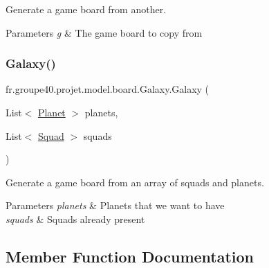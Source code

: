 Generate a game board from another. 


\begin{DoxyParams}{Parameters}
{\em g} & The game board to copy from \\
\hline
\end{DoxyParams}
\mbox{\label{classfr_1_1groupe40_1_1projet_1_1model_1_1board_1_1_galaxy_ab214654e58ccf7bc40216d177cde0479}} 
\subsubsection{\texorpdfstring{Galaxy()}{Galaxy()}\hspace{0.1cm}{\footnotesize\ttfamily [2/2]}}
{\footnotesize\ttfamily fr.\+groupe40.\+projet.\+model.\+board.\+Galaxy.\+Galaxy (\begin{DoxyParamCaption}\item[{List$<$ \mbox{\hyperlink{classfr_1_1groupe40_1_1projet_1_1model_1_1planets_1_1_planet}{Planet}} $>$}]{planets,  }\item[{List$<$ \mbox{\hyperlink{classfr_1_1groupe40_1_1projet_1_1model_1_1ships_1_1_squad}{Squad}} $>$}]{squads }\end{DoxyParamCaption})}



Generate a game board from an array of squads and planets. 


\begin{DoxyParams}{Parameters}
{\em planets} & Planets that we want to have \\
\hline
{\em squads} & Squads already present \\
\hline
\end{DoxyParams}


\subsection{Member Function Documentation}
\mbox{\label{classfr_1_1groupe40_1_1projet_1_1model_1_1board_1_1_galaxy_af4b01f22d35d56f0b775c9244eff5acf}} 
